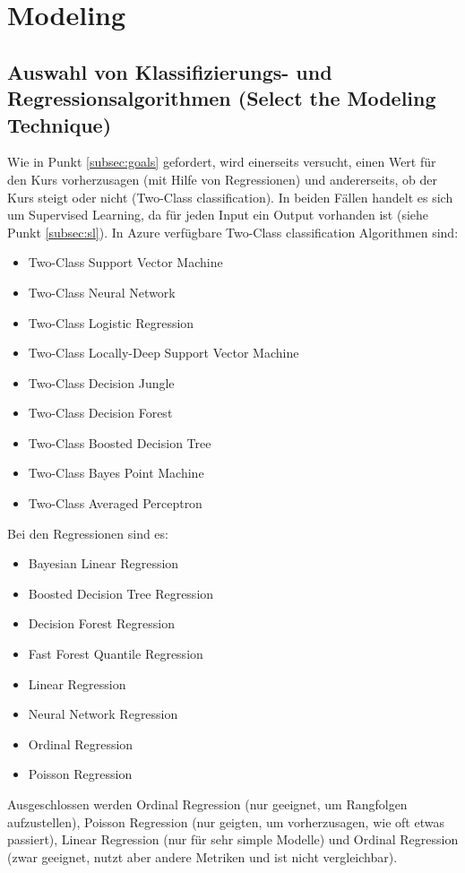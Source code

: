 


\section{Modeling}
\subsection*{Auswahl von Klassifizierungs- und Regressionsalgorithmen (Select the Modeling Technique)}
Wie in Punkt \ref{subsec:goals} gefordert, wird einerseits versucht, einen Wert für den Kurs vorherzusagen (mit Hilfe von Regressionen) und andererseits, ob der Kurs steigt oder nicht (Two-Class classification). In beiden Fällen handelt es sich um Supervised Learning, da für jeden Input ein Output vorhanden ist (siehe Punkt \ref{subsec:sl}).
In Azure verfügbare Two-Class classification Algorithmen sind:
\begin{itemize}
\item Two-Class Support Vector Machine
\item Two-Class Neural Network
\item Two-Class Logistic Regression
\item Two-Class Locally-Deep Support Vector Machine
\item Two-Class Decision Jungle
\item Two-Class Decision Forest
\item Two-Class Boosted Decision Tree
\item Two-Class Bayes Point Machine
\item Two-Class Averaged Perceptron
\end{itemize}
Bei den Regressionen sind es:
\begin{itemize}
\item Bayesian Linear Regression
\item Boosted Decision Tree Regression
\item Decision Forest Regression
\item Fast Forest Quantile Regression
\item Linear Regression
\item Neural Network Regression
\item Ordinal Regression
\item Poisson Regression
\end{itemize}
Ausgeschlossen werden Ordinal Regression (nur geeignet, um Rangfolgen aufzustellen), Poisson Regression (nur geigten, um vorherzusagen, wie oft etwas passiert), Linear Regression (nur für sehr simple Modelle) und Ordinal Regression (zwar geeignet, nutzt aber andere Metriken und ist nicht vergleichbar).
